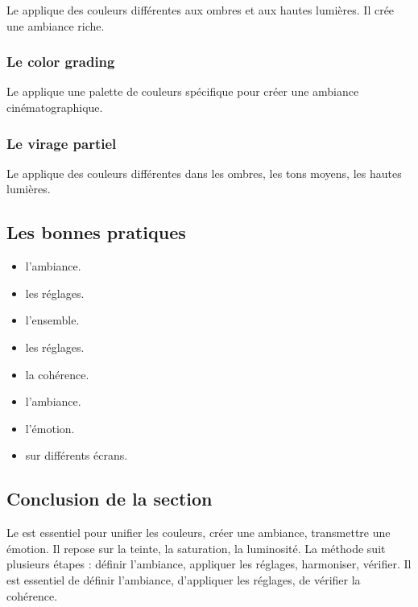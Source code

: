 Le  applique des couleurs différentes aux ombres et aux hautes lumières. Il crée une ambiance riche.

\subsubsection{Le color grading}

Le  applique une palette de couleurs spécifique pour créer une ambiance cinématographique.

\subsubsection{Le virage partiel}

Le  applique des couleurs différentes dans les ombres, les tons moyens, les hautes lumières.

\subsection{Les bonnes pratiques}

\begin{itemize}
    \item {} l'ambiance.
    \item {} les réglages.
    \item {} l'ensemble.
    \item {} les réglages.
    \item {} la cohérence.
    \item {} l'ambiance.
    \item {} l'émotion.
    \item {} sur différents écrans.
\end{itemize}

\subsection*{Conclusion de la section}

Le  est essentiel pour unifier les couleurs, créer une ambiance, transmettre une émotion. Il repose sur la teinte, la saturation, la luminosité. La méthode suit plusieurs étapes : définir l'ambiance, appliquer les réglages, harmoniser, vérifier. Il est essentiel de définir l'ambiance, d'appliquer les réglages, de vérifier la cohérence.

